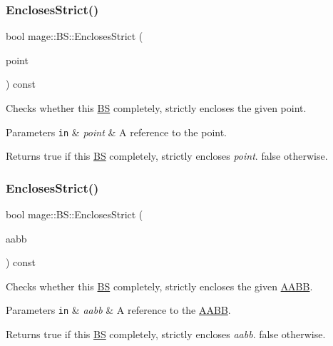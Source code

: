\subsubsection{\texorpdfstring{Encloses\+Strict()}{EnclosesStrict()}\hspace{0.1cm}{\footnotesize\ttfamily [1/3]}}
{\footnotesize\ttfamily bool mage\+::\+B\+S\+::\+Encloses\+Strict (\begin{DoxyParamCaption}\item[{const \hyperlink{structmage_1_1_point3}{Point3} \&}]{point }\end{DoxyParamCaption}) const}

Checks whether this \hyperlink{structmage_1_1_b_s}{BS} completely, strictly encloses the given point.


\begin{DoxyParams}[1]{Parameters}
\mbox{\tt in}  & {\em point} & A reference to the point. \\
\hline
\end{DoxyParams}
\begin{DoxyReturn}{Returns}
{\ttfamily true} if this \hyperlink{structmage_1_1_b_s}{BS} completely, strictly encloses {\itshape point}. {\ttfamily false} otherwise. 
\end{DoxyReturn}
\hypertarget{structmage_1_1_b_s_a2114f30ef1fd41b0fdeab31c24a66b7a}{}\label{structmage_1_1_b_s_a2114f30ef1fd41b0fdeab31c24a66b7a} 
\subsubsection{\texorpdfstring{Encloses\+Strict()}{EnclosesStrict()}\hspace{0.1cm}{\footnotesize\ttfamily [2/3]}}
{\footnotesize\ttfamily bool mage\+::\+B\+S\+::\+Encloses\+Strict (\begin{DoxyParamCaption}\item[{const \hyperlink{structmage_1_1_a_a_b_b}{A\+A\+BB} \&}]{aabb }\end{DoxyParamCaption}) const}

Checks whether this \hyperlink{structmage_1_1_b_s}{BS} completely, strictly encloses the given \hyperlink{structmage_1_1_a_a_b_b}{A\+A\+BB}.


\begin{DoxyParams}[1]{Parameters}
\mbox{\tt in}  & {\em aabb} & A reference to the \hyperlink{structmage_1_1_a_a_b_b}{A\+A\+BB}. \\
\hline
\end{DoxyParams}
\begin{DoxyReturn}{Returns}
{\ttfamily true} if this \hyperlink{structmage_1_1_b_s}{BS} completely, strictly encloses {\itshape aabb}. {\ttfamily false} otherwise. 
\end{DoxyReturn}
\hypertarget{structmage_1_1_b_s_ad1b81567c640283bd5355073dd0bf226}{}\label{structmage_1_1_b_s_ad1b81567c640283bd5355073dd0bf226} 
